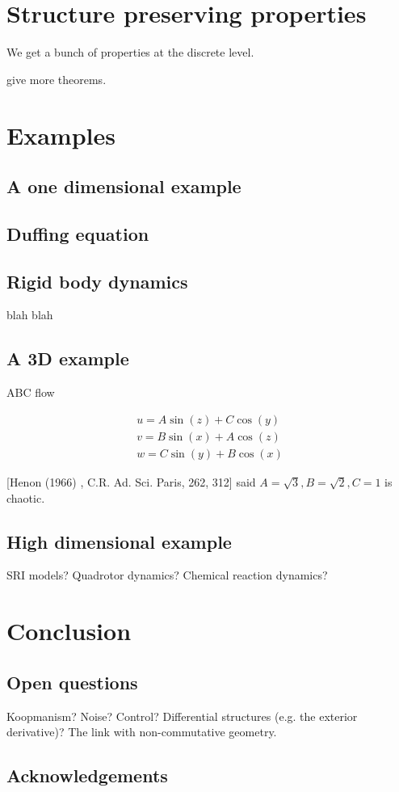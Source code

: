 \documentclass[12pt]{amsart}
\begin{document}
\section{Structure preserving properties}
\label{sec:structure}
We get a bunch of properties at the discrete level.


give more theorems.

\section{Examples}

\subsection{A one dimensional example}

\subsection{Duffing equation}

\subsection{Rigid body dynamics}
blah blah

\subsection{A 3D example}
ABC flow

\begin{align*}
	u = A \sin(z) + C \cos(y) \\
	v = B \sin(x) + A \cos(z) \\
	w = C \sin(y) + B \cos(x)
\end{align*}

[Henon (1966) , C.R. Ad. Sci. Paris, 262, 312]
said $A = \sqrt{3},B = \sqrt{2},C=1$ is chaotic.

\subsection{High dimensional example}
SRI models?  Quadrotor dynamics?  Chemical reaction dynamics?

\section{Conclusion}

\subsection{Open questions}
Koopmanism?  Noise?  Control?  Differential structures (e.g. the exterior derivative)?  The link with non-commutative geometry.

\subsection{Acknowledgements}



\end{document}
